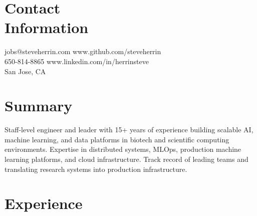 \documentclass[margin,line]{resume}
\begin{document}
\begin{resume}

    \section{\mysidestyle Contact\\Information}

    jobs@steveherrin.com		\hfill www.github.com/steveherrin		\vspace{0mm}\\\vspace{0mm}%
    650-814-8865				\hfill www.linkedin.com/in/herrinsteve		\vspace{0mm}\\\vspace{-4.5mm}%
    San Jose, CA    				\hfill		\vspace{0mm}\\\vspace{0mm}%

    \section{\mysidestyle Summary}
   Staff-level engineer and leader with 15+ years of experience building scalable AI, machine learning, and data platforms in biotech and scientific computing environments. Expertise in distributed systems, MLOps, production machine learning platforms, and cloud infrastructure. Track record of leading teams and translating research systems into production infrastructure.
    \section{\mysidestyle Experience}


\end{resume}
\end{document}
